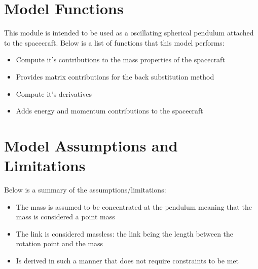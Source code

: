 \section{Model Functions}

This module is intended to be used as a oscillating spherical pendulum attached to the spacecraft. Below is a list of functions that this model performs:

\begin{itemize}
	\item Compute it's contributions to the mass properties of the spacecraft
	\item Provides matrix contributions for the back substitution method
	\item Compute it's derivatives
	\item Adds energy and momentum contributions to the spacecraft
\end{itemize}

\section{Model Assumptions and Limitations}
Below is a summary of the assumptions/limitations:

\begin{itemize}
	\item The mass is assumed to be concentrated at the pendulum meaning that the mass is considered a point mass
	\item The link is considered massless: the link being the length between the rotation point and the mass 
	\item Is derived in such a manner that does not require constraints to be met
\end{itemize}